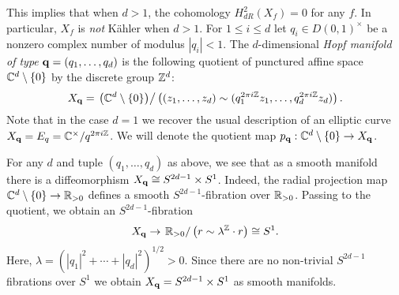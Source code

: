 \documentclass[10pt]{amsart}
\begin{document}
This implies that when $d > 1$, the cohomology $H^{2}_{dR} (X_f) = 0$ for any $f$. 
In particular, $X_f$ is {\em not} K\"{a}hler when $d > 1$. 
For $1 \leq i \leq d$ let $q_i \in D(0,1)^{\times}$ be a nonzero complex number of modulus $|q_i| <1$. 
The $d$-dimensional {\em Hopf manifold of type} ${\bf q} = (q_1,\ldots,q_d)$ is the following quotient of punctured affine space $\mathbb C^d \setminus \{0\}$ by the discrete group $\mathbb Z^d$:
\[
X_{\bf q} = \left. \left(\mathbb C^d \setminus \{0\}\right) \right/ \left( (z_1,\ldots,z_d) \sim (q_1^{2\pi i \mathbb Z} z_1, \ldots,q_d^{2 \pi i \mathbb Z} z_d) \right) .
\]
Note that in the case $d = 1$ we recover the usual description of an elliptic curve $X_{\bf q} = E_q = \mathbb C^\times / q^{2 \pi i \mathbb Z}$. 
We will denote the quotient map $p_{\bf q} : \mathbb C^d \setminus \{0\} \to X_{\bf q}$. 

For any $d$ and tuple $(q_1,\ldots, q_d)$ as above, we see that as a smooth manifold there is a diffeomorphism $X_{\bf q} \cong S^{2d-1} \times S^1$. 
Indeed, the radial projection map $\mathbb C^d \setminus \{0\} \to \mathbb R_{>0}$ defines a smooth $S^{2d-1}$-fibration over $\mathbb R_{>0}$. 
Passing to the quotient, we obtain an $S^{2d - 1}$-fibration 
\[
X_{\bf q} \to \left. \mathbb R_{>0} \right/ \left(r \sim \lambda^{\mathbb Z} \cdot r \right) \cong S^1 .
\]
Here, $\lambda = (|q_1|^2 + \cdots + |q_d|^2)^{1/2} > 0$. 
Since there are no non-trivial $S^{2d-1}$ fibrations over $S^1$ we obtain $X_{\bf q} = S^{2d-1} \times S^1$ as smooth manifolds. 
\end{document}
